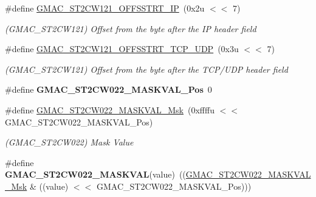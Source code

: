 \begin{DoxyCompactItemize}
\mbox{\label{group__SAMV71__GMAC_ga2afe42fee1a93a74df66f9b1b6f67ff9}} 
\#define \mbox{\hyperlink{group__SAMV71__GMAC_ga2afe42fee1a93a74df66f9b1b6f67ff9}{G\+M\+A\+C\+\_\+\+S\+T2\+C\+W121\+\_\+\+O\+F\+F\+S\+S\+T\+R\+T\+\_\+\+IP}}~(0x2u $<$$<$ 7)
\begin{DoxyCompactList}\small\item\em (G\+M\+A\+C\+\_\+\+S\+T2\+C\+W121) Offset from the byte after the IP header field \end{DoxyCompactList}\item 
\mbox{\label{group__SAMV71__GMAC_ga4f76808f397c82d81603a31e45e9e880}} 
\#define \mbox{\hyperlink{group__SAMV71__GMAC_ga4f76808f397c82d81603a31e45e9e880}{G\+M\+A\+C\+\_\+\+S\+T2\+C\+W121\+\_\+\+O\+F\+F\+S\+S\+T\+R\+T\+\_\+\+T\+C\+P\+\_\+\+U\+DP}}~(0x3u $<$$<$ 7)
\begin{DoxyCompactList}\small\item\em (G\+M\+A\+C\+\_\+\+S\+T2\+C\+W121) Offset from the byte after the T\+C\+P/\+U\+DP header field \end{DoxyCompactList}\item 
\mbox{\label{group__SAMV71__GMAC_ga31ce93b8cfa2abf39eae74c7fa29c1dd}} 
\#define {\bfseries G\+M\+A\+C\+\_\+\+S\+T2\+C\+W022\+\_\+\+M\+A\+S\+K\+V\+A\+L\+\_\+\+Pos}~0
\item 
\mbox{\label{group__SAMV71__GMAC_ga483540a569c252160704b469f4d54664}} 
\#define \mbox{\hyperlink{group__SAMV71__GMAC_ga483540a569c252160704b469f4d54664}{G\+M\+A\+C\+\_\+\+S\+T2\+C\+W022\+\_\+\+M\+A\+S\+K\+V\+A\+L\+\_\+\+Msk}}~(0xffffu $<$$<$ G\+M\+A\+C\+\_\+\+S\+T2\+C\+W022\+\_\+\+M\+A\+S\+K\+V\+A\+L\+\_\+\+Pos)
\begin{DoxyCompactList}\small\item\em (G\+M\+A\+C\+\_\+\+S\+T2\+C\+W022) Mask Value \end{DoxyCompactList}\item 
\mbox{\label{group__SAMV71__GMAC_gad0af582cb94b5b3909c7d8ee082fc158}} 
\#define {\bfseries G\+M\+A\+C\+\_\+\+S\+T2\+C\+W022\+\_\+\+M\+A\+S\+K\+V\+AL}(value)~((\mbox{\hyperlink{group__SAMV71__GMAC_ga483540a569c252160704b469f4d54664}{G\+M\+A\+C\+\_\+\+S\+T2\+C\+W022\+\_\+\+M\+A\+S\+K\+V\+A\+L\+\_\+\+Msk}} \& ((value) $<$$<$ G\+M\+A\+C\+\_\+\+S\+T2\+C\+W022\+\_\+\+M\+A\+S\+K\+V\+A\+L\+\_\+\+Pos)))

\end{DoxyCompactItemize}
